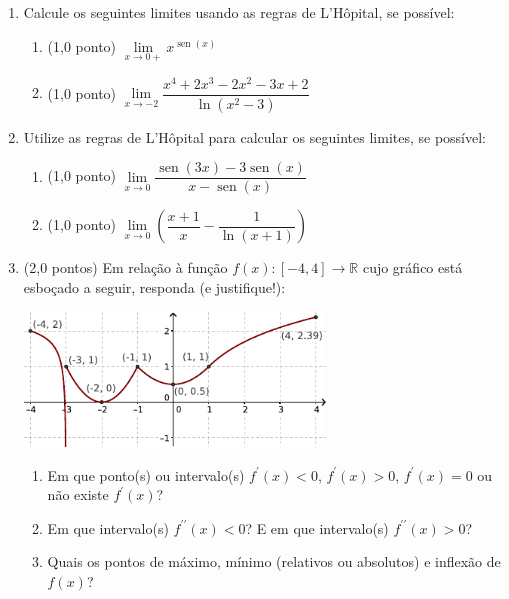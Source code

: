 \documentclass[12pt,a4paper]{article}
\begin{document}
\begin{enumerate}
\item Calcule os seguintes limites usando as regras de L'Hôpital, se possível:
\begin{multicols}{2}
\begin{enumerate}
\item (1,0 ponto) $\lim\limits_{x\to 0+} x^{\operatorname{sen}{(x)}}$
\item (1,0 ponto) $\lim\limits_{x\to -2} \dfrac{x^4+2x^3-2x^2-3x+2}{\ln{(x^2-3)}}$
\end{enumerate}
\end{multicols}

\item Utilize as regras de L'Hôpital para calcular os seguintes limites, se possível:
\begin{multicols}{2}
\begin{enumerate}
\item (1,0 ponto) $\lim\limits_{x\to 0} \dfrac{\operatorname{sen}{(3x)} - 3\operatorname{sen}{(x)}}{x-\operatorname{sen}{(x)}}$
\item (1,0 ponto) $\lim\limits_{x\to 0} \left(\dfrac{x+1}{x}-\dfrac{1}{\ln{(x+1)}}\right)$
\end{enumerate}
\end{multicols}

\item (2,0 pontos) Em relação à função $f(x): [-4,4] \to \mathbb{R}$ cujo gráfico está esboçado a seguir, responda (e justifique!):

\includegraphics[width=8.0cm]{img/prova-3-tads-1-fig-1}

\begin{enumerate}
\item Em que ponto(s) ou intervalo(s) $f^\prime(x) < 0$, $f^\prime(x) > 0$, $f^\prime(x) = 0$ ou não existe $f^\prime(x)$?
\item Em que intervalo(s) $f^{\prime\prime}(x) < 0$? E em que intervalo(s) $f^{\prime\prime}(x) > 0$?
\item Quais os pontos de máximo, mínimo (relativos ou absolutos) e inflexão de $f(x)$?
\end{enumerate}


\end{enumerate}
\end{document}
